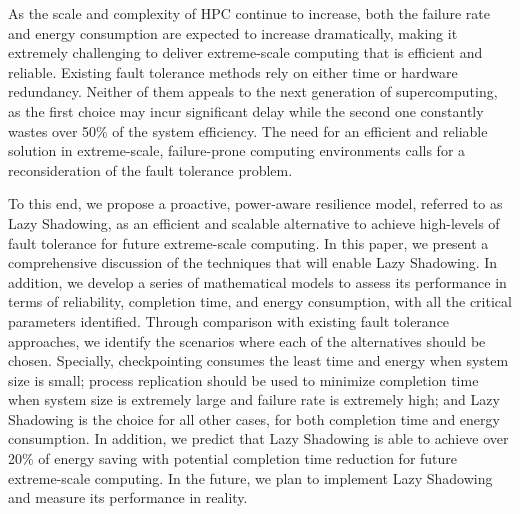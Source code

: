 As the scale and complexity of HPC continue to increase, both the failure rate and energy consumption are expected to increase dramatically, making it extremely challenging to deliver extreme-scale computing that is efficient and reliable. Existing fault tolerance methods rely on either time or hardware redundancy. Neither of them appeals to the next generation of supercomputing, as the first choice may incur significant delay while the second one constantly wastes over 50\% of the system efficiency. The need for an efficient and reliable solution in extreme-scale, failure-prone computing environments calls for a reconsideration of the fault tolerance problem. 

To this end, we propose a proactive, power-aware resilience model, referred to as Lazy Shadowing, as an efficient and scalable alternative to achieve high-levels of fault tolerance for future extreme-scale computing. In this paper, we present a comprehensive discussion of the techniques that will enable Lazy Shadowing. In addition, we develop a series of mathematical models to assess its performance in terms of reliability, completion time, and energy consumption, with all the critical parameters identified. 
Through comparison with existing fault tolerance approaches, we identify the scenarios where each of the alternatives should be chosen. Specially, checkpointing consumes the least time and energy when system size is small; process replication should be used to minimize completion time when system size is extremely large and failure rate is extremely high; and Lazy Shadowing is the choice for all other cases, for both completion time and energy consumption. 
In addition, we predict that Lazy Shadowing is able to achieve over 20\% of energy saving with potential completion time reduction for future extreme-scale computing. In the future, we plan to implement Lazy Shadowing and measure its performance in reality.

